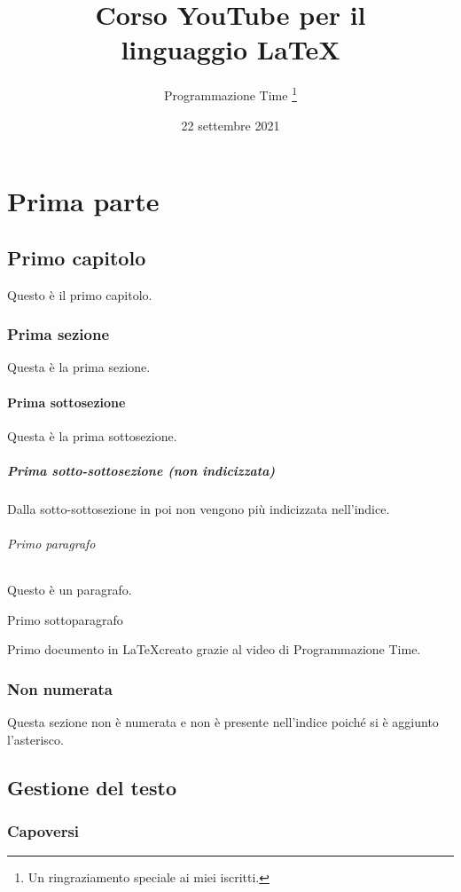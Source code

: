 \documentclass[a4paper,12pt,oneside]{book}
\title{Corso YouTube per il\\linguaggio \LaTeX}
\author{Programmazione Time \thanks{Un ringraziamento speciale ai miei iscritti.}}
\date{22 settembre 2021}	%
\theoremstyle{plain}
\begin{document}
	\begin{titlepage}
		\maketitle
	\end{titlepage}

	\frontmatter
	\tableofcontents
	\listoffigures
	\listoftables
	\mainmatter
	
	\part{Prima parte}
	\chapter{Primo capitolo}
	Questo è il primo capitolo.
	\section{Prima sezione}
	Questa è la prima sezione.
	\subsection{Prima sottosezione}
	Questa è la prima sottosezione.
	\subsubsection{Prima sotto-sottosezione (non indicizzata)}
	Dalla sotto-sottosezione in poi non vengono più indicizzata nell'indice.
	\paragraph{Primo paragrafo}
	Questo è un paragrafo.
	\subparagraph{Primo sottoparagrafo}
	Primo documento in \LaTeX creato grazie al video di Programmazione Time.
	
	
	\section*{Non numerata}
	Questa sezione non è numerata e non è presente nell'indice poiché si è aggiunto l'asterisco.
	
	
	
	\chapter{Gestione del testo}
	\section{Capoversi}
\end{document}
